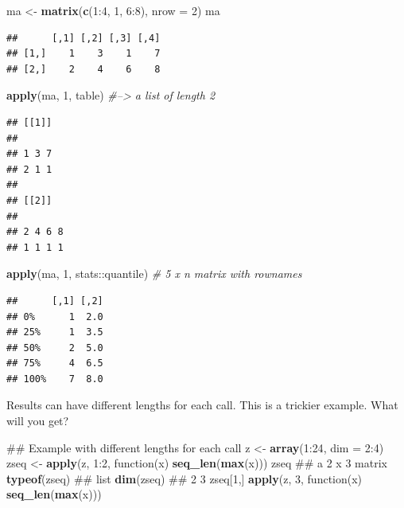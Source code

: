 \documentclass[12pt,]{krantz}
\newenvironment{Shaded}{\begin{snugshade}}{\end{snugshade}}
\newcommand{\KeywordTok}[1]{\textcolor[rgb]{0.13,0.29,0.53}{\textbf{{#1}}}}
\newcommand{\DataTypeTok}[1]{\textcolor[rgb]{0.13,0.29,0.53}{{#1}}}
\newcommand{\DecValTok}[1]{\textcolor[rgb]{0.00,0.00,0.81}{{#1}}}
\newcommand{\StringTok}[1]{\textcolor[rgb]{0.31,0.60,0.02}{{#1}}}
\newcommand{\CommentTok}[1]{\textcolor[rgb]{0.56,0.35,0.01}{\textit{{#1}}}}
\newcommand{\NormalTok}[1]{{#1}}
\theoremstyle{definition}
\theoremstyle{definition}
\theoremstyle{remark}
\begin{document}
\begin{Shaded}
\begin{Highlighting}[]
\NormalTok{ma <-}\StringTok{ }\KeywordTok{matrix}\NormalTok{(}\KeywordTok{c}\NormalTok{(}\DecValTok{1}\NormalTok{:}\DecValTok{4}\NormalTok{, }\DecValTok{1}\NormalTok{, }\DecValTok{6}\NormalTok{:}\DecValTok{8}\NormalTok{), }\DataTypeTok{nrow =} \DecValTok{2}\NormalTok{)}
\NormalTok{ma}
\end{Highlighting}
\end{Shaded}

\begin{verbatim}
##      [,1] [,2] [,3] [,4]
## [1,]    1    3    1    7
## [2,]    2    4    6    8
\end{verbatim}

\begin{Shaded}
\begin{Highlighting}[]
\KeywordTok{apply}\NormalTok{(ma, }\DecValTok{1}\NormalTok{, table)  }\CommentTok{#--> a list of length 2}
\end{Highlighting}
\end{Shaded}

\begin{verbatim}
## [[1]]
## 
## 1 3 7 
## 2 1 1 
## 
## [[2]]
## 
## 2 4 6 8 
## 1 1 1 1
\end{verbatim}

\begin{Shaded}
\begin{Highlighting}[]
\KeywordTok{apply}\NormalTok{(ma, }\DecValTok{1}\NormalTok{, stats::quantile) }\CommentTok{# 5 x n matrix with rownames}
\end{Highlighting}
\end{Shaded}

\begin{verbatim}
##      [,1] [,2]
## 0%      1  2.0
## 25%     1  3.5
## 50%     2  5.0
## 75%     4  6.5
## 100%    7  8.0
\end{verbatim}

Results can have different lengths for each call. This is a trickier
example. What will you get?

\begin{Shaded}
\begin{Highlighting}[]
\NormalTok{## Example with different lengths for each call}
\NormalTok{z <-}\StringTok{ }\KeywordTok{array}\NormalTok{(}\DecValTok{1}\NormalTok{:}\DecValTok{24}\NormalTok{, }\DataTypeTok{dim =} \DecValTok{2}\NormalTok{:}\DecValTok{4}\NormalTok{)}
\NormalTok{zseq <-}\StringTok{ }\KeywordTok{apply}\NormalTok{(z, }\DecValTok{1}\NormalTok{:}\DecValTok{2}\NormalTok{, function(x) }\KeywordTok{seq_len}\NormalTok{(}\KeywordTok{max}\NormalTok{(x)))}
\NormalTok{zseq         ## a 2 x 3 matrix}
\KeywordTok{typeof}\NormalTok{(zseq) ## list}
\KeywordTok{dim}\NormalTok{(zseq) ## 2 3}
\NormalTok{zseq[}\DecValTok{1}\NormalTok{,]}
\KeywordTok{apply}\NormalTok{(z, }\DecValTok{3}\NormalTok{, function(x) }\KeywordTok{seq_len}\NormalTok{(}\KeywordTok{max}\NormalTok{(x)))}
\end{Highlighting}
\end{Shaded}
\end{document}
